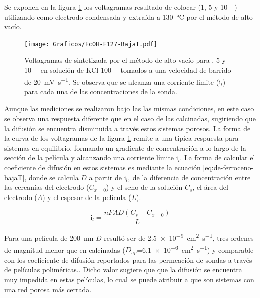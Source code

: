 		Se exponen en la figura \ref{fig:fcoh_bajaT} los voltagramas resultado de colocar \fc\space (1, 5 y \SI{10}{\milli\Molar}) utilizando como electrodo \pdmF\space condensada y extraída a \SI{130}{\celsius} por el método de alto vacío. 
			\begin{figure}[ht]
				\centering
		 	    \texttt{[image: Graficos/FcOH-F127-BajaT.pdf]}
		        \caption[Voltagrama para \fc\space en \pdm\space de baja temperatura]{Voltagramas de \pdmF\space sintetizada por el método de alto vacío para \fc{}, 5 y \SI{10}{\milli\Molar} en solución de KCl \SI{100}{\milli\Molar} tomados a una velocidad de barrido de \SI{20}{\milli\volt\per\second}. Se observa que se alcanza una corriente limite ($\text{i}_l$) para cada una de las concentraciones de la sonda.}
		        \label{fig:fcoh_bajaT}
		      	\end{figure}
		
		Aunque las mediciones se realizaron bajo las las mismas condiciones, en este caso se observa una respuesta diferente que en el caso de las \pdmF\space calcinadas, sugiriendo que la difusión se encuentra disminuida a través estos sistemas porosos. La forma de la curva de los voltagramas de la figura \ref{fig:fcoh_bajaT} remite a una típica respuesta para sistemas en equilibrio, formando un gradiente de concentración a lo largo de la sección de la película y alcanzando una corriente límite $\text{i}_l$. 
		La forma de calcular el coeficiente de difusión en estos sistemas es mediante la ecuación \ref{eq:de-ferroceno-bajaT}, donde se calcula $D$ a partir de $\text{i}_l$, de la diferencia de concentración entre las cercanías del electrodo ($C_{x=0}$) y el seno de la solución $C_s$, el área del electrodo ($A$) y el espesor de la película ($L$).

			\begin{equation}
					\text{i}_l = \frac{nFAD(C_{s}-C_{x=0})}{L}
					\label{eq:de-ferroceno-bajaT}
			\end{equation}
			  	

		Para una película de \SI{200}{nm} $D$ resultó ser de \SI{2.5e-9}{\square\cm\per\second}, tres ordenes de magnitud menor que en \pdmF\space calcinadas ($D_{ap}$=\SI{6,1e-6}{\square\cm\per\second}) y comparable con los coeficiente de difusión reportados para las permeación de sondas a través de películas poliméricas.\cite{Kolb1993}. Dicho valor sugiere que que la difusión se encuentra muy impedida en estas películas, lo cual se puede atribuir a que son sistemas con una red porosa más cerrada. 
		
